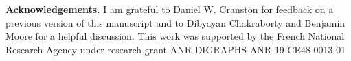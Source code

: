 \documentclass[11pt]{article}
\theoremstyle{definition}
\begin{document}
 


\noindent
\textbf{Acknowledgements.} I am grateful to Daniel W. Cranston for feedback on a previous version of this manuscript and to Dibyayan Chakraborty and Benjamin Moore for a helpful discussion.  This work was supported by the French National Research Agency under research grant ANR DIGRAPHS ANR-19-CE48-0013-01









 
 
  
 {}

 
\end{document}
